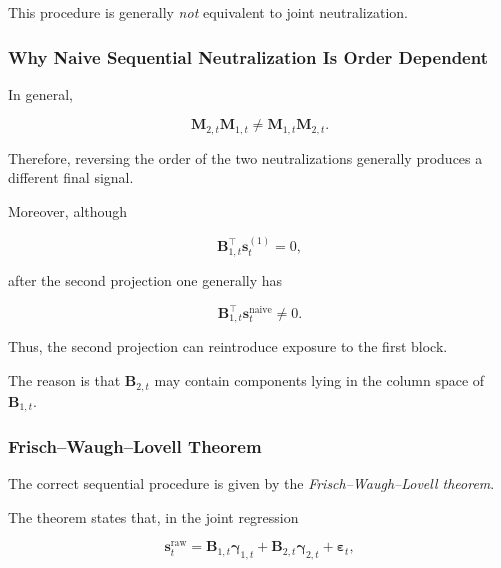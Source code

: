 \documentclass[11pt,a4paper]{article}
\begin{document}
This procedure is generally \emph{not} equivalent to joint neutralization.


\subsubsection{Why Naive Sequential Neutralization Is Order Dependent}

In general,

\begin{equation}
\boxed{
\mathbf{M}_{2,t}
\mathbf{M}_{1,t}
\neq
\mathbf{M}_{1,t}
\mathbf{M}_{2,t}.
}
\end{equation}

Therefore, reversing the order of the two neutralizations generally produces a
different final signal.

Moreover, although

\begin{equation}
\mathbf{B}_{1,t}^\top
\mathbf{s}_t^{(1)}
=
0,
\end{equation}

after the second projection one generally has

\begin{equation}
\boxed{
\mathbf{B}_{1,t}^\top
\mathbf{s}_t^{\mathrm{naive}}
\neq
0.
}
\end{equation}

Thus, the second projection can reintroduce exposure to the first block.

The reason is that $\mathbf{B}_{2,t}$ may contain components lying in the
column space of $\mathbf{B}_{1,t}$.


\subsubsection{Frisch--Waugh--Lovell Theorem}

The correct sequential procedure is given by the
\emph{Frisch--Waugh--Lovell theorem}.

The theorem states that, in the joint regression

\begin{equation}
\mathbf{s}_t^{\mathrm{raw}}
=
\mathbf{B}_{1,t}
\boldsymbol{\gamma}_{1,t}
+
\mathbf{B}_{2,t}
\boldsymbol{\gamma}_{2,t}
+
\boldsymbol{\varepsilon}_t,
\end{equation}
\end{document}
